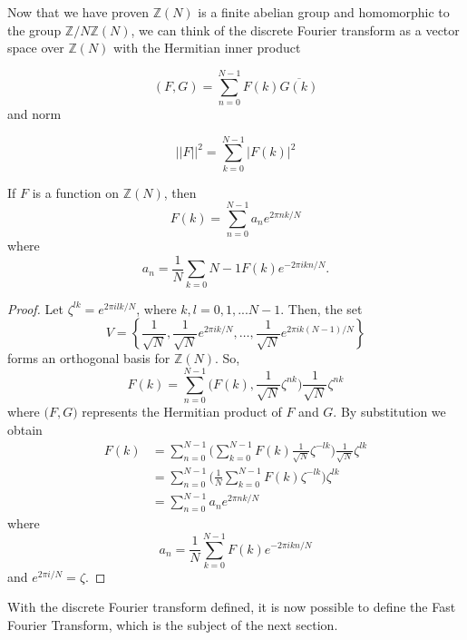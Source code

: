 \documentclass[../article.tex]{subfiles}
\begin{document}
Now that we have proven $\mathbb{Z}(N)$ is a finite abelian group and homomorphic to the group $\mathbb{Z} /N\mathbb{Z}(N)$, we can think of the discrete Fourier transform as a vector space over $\mathbb{Z}(N)$ with the Hermitian inner product

\[
  (F,G) = \sum_{n=0}^{N-1} F(k) \overline{G(k)}
\]
and norm

\[
  ||F||^2 = \sum_{k=0}^{N-1} |F(k)|^2
\]

\begin{theorem}
If $F$ is a function on $\mathbb{Z}(N)$, then
\[
F(k) = \sum_{n=0}^{N-1} a_n e^{2 \pi nk/N}
\]
where
\[
a_n = \frac{1}{N} \sum_{k=0}{N-1} F(k) e^{-2 \pi ikn/N}.
\]
\end{theorem}
\begin{proof}
Let $\zeta^{lk} = e^{2 \pi i lk/N}$, where $k,l = 0,1,...N-1$. Then, the set
\[
V = \left\{ \frac{1}{\sqrt{N}}, \frac{1}{\sqrt{N}}e^{2 \pi i k/N}, \ldots, \frac{1}{\sqrt{N}}e^{2 \pi i k(N-1)/N} \right\}
\]
forms an orthogonal basis for $\mathbb{Z}(N)$. So,
\[
F(k) = \sum_{n=0}^{N-1} \Big(F(k), \frac{1}{\sqrt{N}}\zeta^{nk} \Big) \frac{1}{\sqrt{N}}\zeta^{nk}
\]
where $\big(F,G \big)$ represents the Hermitian product of $F$ and $G$. By substitution we obtain
\begin{align*}
F(k) &= \sum_{n=0}^{N-1} \Bigg(\sum_{k=0}^{N-1} F(k) \frac{1}{\sqrt{N}} \zeta^{-lk} \Bigg) \frac{1}{\sqrt{N}} \zeta^{lk} \\
&= \sum_{n=0}^{N-1} \Bigg(\frac{1}{N} \sum_{k=0}^{N-1} F(k) \zeta^{-lk} \Bigg) \zeta^{lk} \\
&= \sum_{n=0}^{N-1} a_n e^{2 \pi nk/N}
\end{align*}
where
\[
a_n = \frac{1}{N} \sum_{k=0}^{N-1} F(k) e^{-2 \pi ikn/N}
\]
and $e^{2 \pi i/N} = \zeta$.
\end{proof}

With the discrete Fourier transform defined, it is now possible to define the Fast Fourier Transform, which is the subject of the next section.
\end{document}
